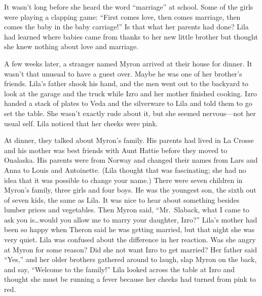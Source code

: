 \documentclass[
  letterpaper,
]{book}
\begin{document}
It wasn't long before she heard the word ``marriage'' at school. Some of
the girls were playing a clapping game: ``First comes love, then comes
marriage, then comes the baby in the baby carriage!'' Is that what her
parents had done? Lila had learned where babies came from thanks to her
new little brother but thought she knew nothing about love and marriage.

A few weeks later, a stranger named Myron arrived at their house for
dinner. It wasn't that unusual to have a guest over. Maybe he was one of
her brother's friends. Lila's father shook his hand, and the men went
out to the backyard to look at the garage and the truck while Izro and
her mother finished cooking. Izro handed a stack of plates to Veda and
the silverware to Lila and told them to go set the table. She wasn't
exactly rude about it, but she seemed nervous---not her usual self. Lila
noticed that her cheeks were pink.

At dinner, they talked about Myron's family. His parents had lived in La
Crosse and his mother was best friends with Aunt Hattie before they
moved to Onalaska. His parents were from Norway and changed their names
from Lars and Anna to Louis and Antoinette. (Lila thought that was
fascinating; she had no idea that it was possible to change your name.)
There were seven children in Myron's family, three girls and four boys.
He was the youngest son, the sixth out of seven kids, the same as Lila.
It was nice to hear about something besides lumber prices and
vegetables. Then Myron said, ``Mr.~Slaback, what I came to ask you
is\ldots would you allow me to marry your daughter, Izro?'' Lila's
mother had been so happy when Theron said he was getting married, but
that night she was very quiet. Lila was confused about the difference in
her reaction. Was she angry at Myron for some reason? Did she not want
Izro to get married? Her father said ``Yes,'' and her older brothers
gathered around to laugh, slap Myron on the back, and say, ``Welcome to
the family!'' Lila looked across the table at Izro and thought she must
be running a fever because her cheeks had turned from pink to red.
\end{document}
